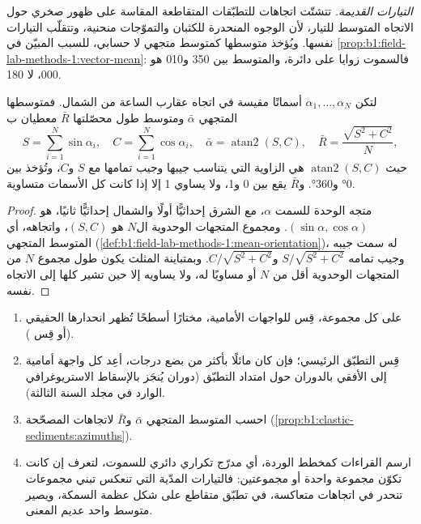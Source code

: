 \emph{التيارات القديمة.} تتشتّت اتجاهات  للتطبّقات المتقاطعة المقاسة على ظهور صخري حول الاتجاه المتوسط للتيار، لأن الوجوه المنحدرة للكثبان والتموّجات منحنية، وتتقلّب التيارات نفسها. ويُؤخذ متوسطها كمتوسط متجهي لا حسابي، للسبب المبيّن في \cref{prop:b1:field-lab-methods-1:vector-mean}: فالسموت زوايا على دائرة، والمتوسط بين 350 و\num{010} هو 000، لا 180.

\begin{proposition}\label{prop:b1:clastic-sediments:azimuths}
لتكن $\alpha_1, \ldots, \alpha_N$ أسماتًا مقيسة في اتجاه عقارب الساعة من الشمال. فمتوسطها المتجهي $\bar\alpha$ ومتوسط طول محصّلتها $\bar R$ معطيان ب
\[
  S = \sum_{i=1}^N \sin\alpha_i, \quad C = \sum_{i=1}^N \cos\alpha_i, \quad
  \bar\alpha = \operatorname{atan2}(S, C), \quad \bar R = \frac{\sqrt{S^2 + C^2}}{N},
\]
حيث $\operatorname{atan2}(S, C)$ هي الزاوية التي يتناسب جيبها وجيب تمامها مع $S$ و$C$، وتُؤخذ بين \ang{0} و\ang{360}. و$\bar R$ يقع بين 0 و\num{1}، ولا يساوي 1 إلا إذا كانت كل الأسمات متساوية.
\end{proposition}

\begin{proof}
متجه الوحدة للسمت $\alpha$، مع الشرق إحداثيًّا أولًا والشمال إحداثيًّا ثانيًا، هو $(\sin\alpha, \cos\alpha)$. ومجموع المتجهات الوحدوية ال$N$ هو $(S, C)$، واتجاهه، أي المتوسط المتجهي (\cref{def:b1:field-lab-methods-1:mean-orientation})، له سمت جيبه وجيب تمامه $S/\sqrt{S^2+C^2}$ و$C/\sqrt{S^2+C^2}$. وبمتباينة المثلث يكون طول مجموع $N$ من المتجهات الوحدوية أقل من $N$ أو مساويًا له، ولا يساويه إلا حين تشير كلها إلى الاتجاه نفسه.
\end{proof}

\begin{method}\label{met:b1:clastic-sediments:palaeocurrent}
\begin{enumerate}
  \item على كل مجموعة، قِس  للواجهات الأمامية، مختارًا أسطحًا تُظهر انحدارها الحقيقي (أو قِس  ).
  \item قِس  التطبّق الرئيسي؛ فإن كان مائلًا بأكثر من بضع درجات، أعِد كل واجهة أمامية إلى الأفقي بالدوران حول امتداد التطبّق (دوران يُنجَز بالإسقاط الاستريوغرافي الوارد في مجلد السنة الثالثة).
  \item احسب المتوسط المتجهي $\bar\alpha$ و$\bar R$ لاتجاهات  المصحّحة (\cref{prop:b1:clastic-sediments:azimuths}).
  \item ارسم القراءات كمخطط الوردة، أي مدرّج تكراري دائري للسموت، لتعرف إن كانت تكوّن مجموعة واحدة أو مجموعتين: فالتيارات المدّية التي تنعكس تبني مجموعات تنحدر في اتجاهات متعاكسة، في تطبّق متقاطع على شكل عظمة السمكة، ويصير متوسط واحد عديم المعنى.
\end{enumerate}
\end{method}

